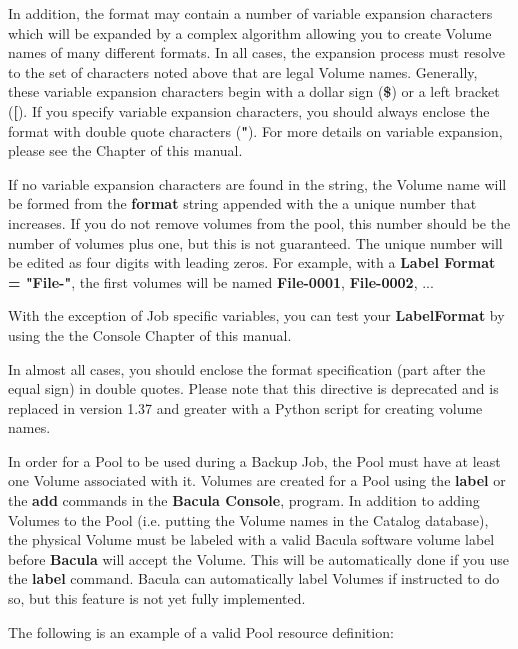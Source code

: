 \begin{description}
   In addition, the format may contain a number of variable expansion
   characters which will be expanded by a complex algorithm allowing you to
   create Volume names of many different formats.  In all cases, the
   expansion process must resolve to the set of characters noted above that
   are legal Volume names.  Generally, these variable expansion characters
   begin with a dollar sign ({\bf \$}) or a left bracket ({\bf [}).  If you
   specify variable expansion characters, you should always enclose the
   format with double quote characters ({\bf "}).  For more details on
   variable expansion, please see the  Chapter of this manual.

   If no variable expansion characters are found in the string, the Volume
   name will be formed from the {\bf format} string appended with the
   a unique number that increases.  If you do not remove volumes from the
   pool, this number should be the number of volumes plus one, but this
   is not guaranteed. The unique number will be edited as four
   digits with leading zeros.  For example, with a {\bf Label Format =
   "File-"}, the first volumes will be named {\bf File-0001}, {\bf
   File-0002}, ...

   With the exception of Job specific variables, you can test your {\bf
   LabelFormat} by using the  the Console Chapter
   of this manual.

   In almost all cases, you should enclose the format specification (part
   after the equal sign) in double quotes.  Please note that this directive
   is deprecated and is replaced in version 1.37 and greater with a Python
   script for creating volume names.

\end{description}

In order for a Pool to be used during a Backup Job, the Pool must have at
least one Volume associated with it.  Volumes are created for a Pool using
the {\bf label} or the {\bf add} commands in the {\bf Bacula Console},
program.  In addition to adding Volumes to the Pool (i.e.  putting the
Volume names in the Catalog database), the physical Volume must be labeled
with a valid Bacula software volume label before {\bf Bacula} will accept
the Volume.  This will be automatically done if you use the {\bf label}
command.  Bacula can automatically label Volumes if instructed to do so,
but this feature is not yet fully implemented.

The following is an example of a valid Pool resource definition: 

